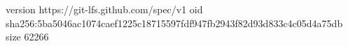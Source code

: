 version https://git-lfs.github.com/spec/v1
oid sha256:5ba5046ac1074caef1225c18715597fdf947fb2943f82d93d833c4c05d4a75db
size 62266
